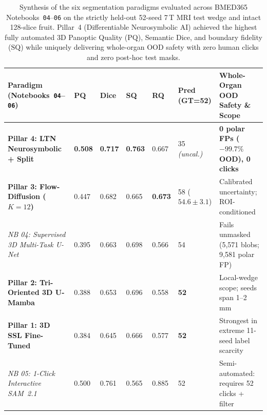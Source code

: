 \documentclass[10pt,a4paper]{article}
\renewcommand{\_}{\origunderscore\allowbreak}
\begin{document}
\begin{table}[htbp]
\centering
\caption[Synthesis of six segmentation paradigms (Notebooks 04--06)]{Synthesis of the six segmentation paradigms evaluated across BMED365 Notebooks~\texttt{04}--\texttt{06} on the strictly held-out 52-seed 7\,T MRI test wedge and intact 128-slice fruit. Pillar~4 (Differentiable Neurosymbolic AI) achieved the highest fully automated 3D Panoptic Quality ($\text{PQ}$), Semantic Dice, and boundary fidelity ($\text{SQ}$) while uniquely delivering whole-organ OOD safety with zero human clicks and zero post-hoc test masks.}
\label{tab:six_pillars}
{\footnotesize
\renewcommand{\arraystretch}{1.24}
\begin{tabularx}{\textwidth}{L{4.7cm} C{0.85cm} C{0.85cm} C{0.85cm} C{0.85cm} C{1.65cm} Y}
\toprule
{}\textbf{Paradigm (Notebooks~\texttt{04}--\texttt{06})} & \textbf{PQ} & \textbf{Dice} & \textbf{SQ} & \textbf{RQ} & \textbf{Pred (GT=52)} & \textbf{Whole-Organ OOD Safety \& Scope} \\
\midrule
\textbf{Pillar 4: LTN Neurosymbolic + Split}~\cite{badreddine2022ltn} & \textbf{0.508} & \textbf{0.717} & \textbf{0.763} & 0.667 & 35 \textit{(uncal.)} & \textbf{0 polar FPs ($-99.7\%$ OOD), 0 clicks} \\
\textbf{Pillar 3: Flow-Diffusion ($K{=}12$)}~\cite{liu2023rectifiedflow,rahman2023cimd} & 0.447 & 0.682 & 0.665 & \textbf{0.673} & 58 ($54.6{\pm}3.1$) & Calibrated uncertainty; ROI-conditioned \\
\textit{NB 04: Supervised 3D Multi-Task U-Net}~\cite{cicek2016unet3d} & 0.395 & 0.663 & 0.698 & 0.566 & 54 & Fails unmasked (5,571 blobs; 9,581 polar FP) \\
\textbf{Pillar 2: Tri-Oriented 3D U-Mamba}~\cite{gu2024mamba,ma2024umamba} & 0.388 & 0.653 & 0.696 & 0.558 & \textbf{52} & Local-wedge scope; seeds span 1--2\,mm \\
\textbf{Pillar 1: 3D SSL Fine-Tuned}~\cite{zhou2021modelsgenesis} & 0.384 & 0.645 & 0.666 & 0.577 & \textbf{52} & Strongest in extreme 11-seed label scarcity \\
\textit{NB 05: 1-Click Interactive SAM~2.1}~\cite{ravi2024sam2,ma2024medsam} & 0.500 & 0.761 & 0.565 & 0.885 & 52 & Semi-automated: requires 52 clicks + filter \\
\bottomrule
\end{tabularx}
}
\end{table}
\end{document}
